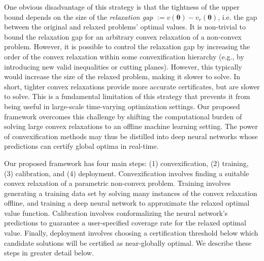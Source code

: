 \documentclass[10pt]{article} %
\theoremstyle{plain}
\theoremstyle{definition}
\theoremstyle{remark}
\begin{document}
One obvious disadvantage of this strategy is that the tightness of the upper bound depends on the size of the \textit{relaxation gap} $:= v(\bm{\theta}) - v_r(\bm{\theta})$, i.e. the gap between the original and relaxed problems' optimal values. It is non-trivial to bound the relaxation gap for an arbitrary convex relaxation of a non-convex problem. However, it is possible to control the relaxation gap by increasing the order of the convex relaxation within some convexification hierarchy (e.g., by introducing new valid inequalities or cutting planes). However, this typically would increase the size of the relaxed problem, making it slower to solve. In short, tighter convex relaxations provide more accurate certificates, but are slower to solve. This is a fundamental limitation of this strategy that prevents it from being useful in large-scale time-varying optimization settings.
Our proposed framework overcomes this challenge by shifting the computational burden of solving large convex relaxations to an offline machine learning setting.
The power of convexification methods may thus be distilled into deep neural networks whose predictions can certify global optima in real-time.

Our proposed framework has four main steps: (1) convexification, (2) training, (3) calibration, and (4) deployment. Convexification involves finding a suitable convex relaxation of a parametric non-convex problem. Training involves generating a training data set by solving many instances of the convex relaxation offline, and training a deep neural network to approximate the relaxed optimal value function. Calibration involves conformalizing the neural network's predictions to guarantee a user-specified coverage rate for the relaxed optimal value. Finally, deployment involves choosing a certification threshold below which candidate solutions will be certified as near-globally optimal.
We describe these steps in greater detail below.

\end{document}
